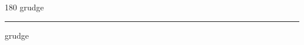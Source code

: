 
\begin{frame}
\begin{center}
\begin{turn}{180}
{\fontsize{2.5cm}{1em}\selectfont grudge}
\end{turn}
\vspace{1em}\par  
\hrule
\vspace{1em}\par  
{\fontsize{2.5cm}{1em}\selectfont grudge}
\end{center}
\end{frame}
